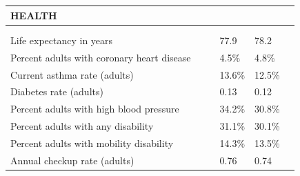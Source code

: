 \documentclass[9pt]{report}
\begin{document}
\newpage
\setlength{\tabcolsep}{.01in} %
\begin{tabular}{p{.10in}p{.10in}p{.10in}p{3.7in}>{\hfill}p{.85in}>{\hfill}p{.85in}>{\hfill}p{.85in}>{\hfill}p{.85in}p{0.1in}}
\multicolumn{9}{l}{\parbox{7.1in}{\raggedright{\large{\strut\textbf{HEALTH}\strut}}}} \\ 
\hline
\multicolumn{4}{l}{\parbox{3.5in}{\raggedright{\textbf{}}}} & \multicolumn{1}{r}{\parbox{.85in}{\strut\raggedleft{\textbf{}\strut}}} & \multicolumn{1}{r}{\parbox{.85in}{\strut\raggedleft{\textbf{}\strut}}} & \multicolumn{1}{r}{\parbox{.85in}{\strut{}}} & \multicolumn{1}{r}{\parbox{.85in}{\strut{}}} & \\ 
\multicolumn{9}{l}{} \\ 
\multicolumn{4}{l}{\parbox{3.6in}{\strut\raggedright{{Life expectancy in years}}\strut}} &  &  & 77.9 & 78.2 & \multicolumn{1}{l}{}  \\ 
\multicolumn{4}{l}{\parbox{3.6in}{\strut\raggedright{{Percent adults with coronary heart disease}}\strut}} &  &  & 4.5\% & 4.8\% & \multicolumn{1}{l}{}  \\ 
\multicolumn{4}{l}{\parbox{3.6in}{\strut\raggedright{{Current asthma rate (adults)}}\strut}} &  &  & 13.6\% & 12.5\% & \multicolumn{1}{l}{}  \\ 
\multicolumn{4}{l}{\parbox{3.6in}{\strut\raggedright{{Diabetes rate (adults)}}\strut}} &  &  & 0.13 & 0.12 & \multicolumn{1}{l}{}  \\ 
\multicolumn{4}{l}{\parbox{3.6in}{\strut\raggedright{{Percent adults with high blood pressure}}\strut}} &  &  & 34.2\% & 30.8\% & \multicolumn{1}{l}{}  \\ 
\multicolumn{4}{l}{\parbox{3.6in}{\strut\raggedright{{Percent adults with any disability}}\strut}} &  &  & 31.1\% & 30.1\% & \multicolumn{1}{l}{}  \\ 
\multicolumn{4}{l}{\parbox{3.6in}{\strut\raggedright{{Percent adults with mobility disability}}\strut}} &  &  & 14.3\% & 13.5\% & \multicolumn{1}{l}{}  \\ 
\multicolumn{4}{l}{\parbox{3.6in}{\strut\raggedright{{Annual checkup rate (adults)}}\strut}} &  &  & 0.76 & 0.74 & \multicolumn{1}{l}{}  \\ 

\end{tabular}
\end{document}
